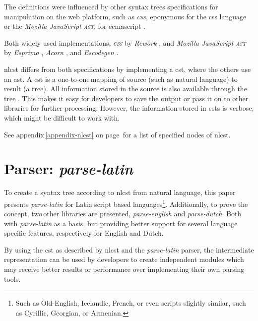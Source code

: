 The definitions were influenced by other syntax trees specifications for
  manipulation on the web platform, such as \emph{\textsc{css}}, eponymous
  for the \acrshort{css} language \autocite{reworkcss/css-source-code} or the
  \emph{Mozilla JavaScript \textsc{ast}}, for \gls{ecmascript}
  \autocite{mozilla.org-spidermonkey-parser_api}.

Both widely used implementations, \emph{\textsc{css}} by \emph{Rework}
  \autocite{reworkcss/rework-source-code}, and \emph{Mozilla JavaScript
  \textsc{ast}} by \emph{Esprima} \autocite{ariya/esprima-source-code},
  \emph{Acorn} \autocite{marijnh/acorn-source-code}, and \emph{Escodegen}
  \autocite{constellation/escodegen-source-code}.

\gls{nlcst} differs from both specifications by implementing a \gls{cst},
  where the others use an \gls{ast}.
A \gls{cst} is a one-to-one\,mapping of source (such as natural language)
  to result (a tree).
All information stored in the source is also available through the tree
  \autocite{thegreenplace.net-abstract-concrete-syntax-trees}.
This makes it easy for developers to save the output or pass it on to other
  libraries for further processing.
However, the information stored in \glspl{cst} is verbose, which might be
  difficult to work with.

\medskip\noindent See appendix\,\ref{appendix-nlcst} on
  page\,\pageref{appendix-nlcst} for a list of specified nodes of \gls{nlcst}.

\section{Parser: \emph{parse-latin}}\label{parser-parse-latin}

To create a syntax tree according to \gls{nlcst} from natural language,
  this paper presents \emph{parse-latin} for Latin script based
  languages\footnote{Such
    as Old-English, Icelandic, French, or even scripts slightly similar, such
    as Cyrillic, Georgian, or Armenian.}.
Additionally, to prove the concept, two\,other libraries are presented,
  \emph{parse-english} and \emph{parse-dutch}.
Both with \emph{parse-latin} as a basis, but providing better support for
  several language specific features, respectively for English and Dutch.

By using the \gls{cst} as described by \gls{nlcst} and the \emph{parse-latin}
  parser, the intermediate representation can be used by developers to
  create independent modules which may receive better results or
  performance over implementing their own parsing tools.

